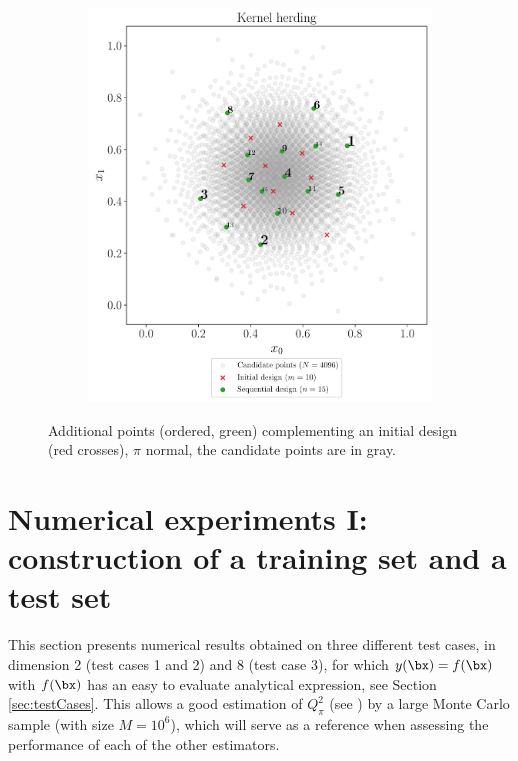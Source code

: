\begin{figure}
\begin{subfigure}[b]{0.48\linewidth}
  \end{subfigure}
  \\
  \begin{subfigure}[b]{0.48\linewidth}
    \centering
    \includegraphics[width=\textwidth]{./part2/figures/SIS/normal2D_KH.pdf}
  \end{subfigure}
  \caption{Additional points (ordered, green) complementing an initial design (red crosses), $\pi$ normal, the candidate points are in gray.}
  \label{fig:normal_validation_designs}
\end{figure}   





\section{Numerical experiments I: construction of a training set and a test set}\label{sec:val_res1}
This section presents numerical results obtained on three different test cases, in dimension 2 (test cases 1 and 2) and 8 (test case 3), for which $y(\bx)=f(\bx)$ with $f(\bx)$ has an easy to evaluate analytical expression, see Section \ref{sec:testCases}. 
This allows a good estimation of $Q_\pi^2$ (see ) by a large Monte Carlo sample (with size $M=10^6$), which will serve as a reference when assessing the performance of each of the other estimators. 

